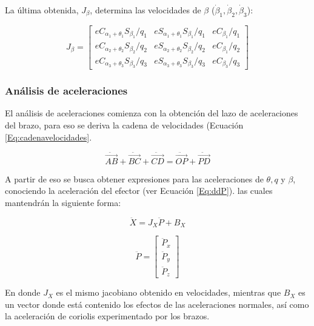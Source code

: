 La última obtenida, $J_{\beta}$, determina las velocidades de $\beta$ ($\dot{\beta}_{1}, \dot{\beta}_{2}, \dot{\beta}_{3}$): 

\begin{equation}
    J_{\beta} = \left[ \begin{array}{ccc}
        eC_{\alpha_1+\theta_1}S_{\beta_1}/q_1 & eS_{\alpha_1+\theta_1}S_{\beta_1}/q_1 & eC_{\beta_1}/q_1 \\
        eC_{\alpha_2+\theta_2}S_{\beta_2}/q_2 & eS_{\alpha_2+\theta_2}S_{\beta_2}/q_2 & eC_{\beta_1}/q_2 \\
        eC_{\alpha_3+\theta_3}S_{\beta_3}/q_3 & eS_{\alpha_3+\theta_3}S_{\beta_3}/q_3 & eC_{\beta_3}/q_3
    \end{array} \right]
\end{equation}
\newpage

\subsubsection{Análisis de aceleraciones}
El análisis de aceleraciones comienza con la obtención del lazo de aceleraciones del brazo, para eso se deriva la cadena de velocidades (Ecuación \ref{Eq:cadenavelocidades}.

\begin{equation}
    \ddot{\vec{AB}} + \ddot{\vec{BC}} + \ddot{\vec{CD}} = \ddot{\vec{OP}} + \ddot{\vec{PD}}
    \label{Eq:cadenaaceleraciones}
\end{equation}

A partir de eso se busca obtener expresiones para las aceleraciones de $\theta, q$ y $\beta$, conociendo la aceleración del efector (ver Ecuación \ref{Eq:ddP}). las cuales mantendrán la siguiente forma:

\begin{equation}
    \ddot{X} = J_{X} \ddot{P} + B_{X}
    \label{Eq:AcelerationExample}
\end{equation}

\begin{equation}
    \ddot{P} = \left[\begin{array}{c} \ddot{P}_x \\ \ddot{P}_y \\ \ddot{P}_z \end{array} \right]
    \label{Eq:ddP}
\end{equation}

En donde $J_{X}$ es el mismo jacobiano obtenido en velocidades, mientras que $B_{X}$ es un vector donde está contenido los efectos de las aceleraciones normales, así como la aceleración de coriolis experimentado por los brazos.

